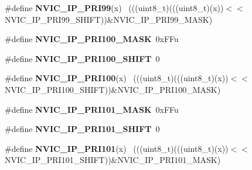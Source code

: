 \begin{DoxyCompactItemize}
\item 
\hypertarget{group___n_v_i_c___register___masks_gad6e4c8571bb74c445e0c6dde178438e6}{}\#define {\bfseries N\+V\+I\+C\+\_\+\+I\+P\+\_\+\+P\+R\+I99}(x)                                              ~(((uint8\+\_\+t)(((uint8\+\_\+t)(x))$<$$<$N\+V\+I\+C\+\_\+\+I\+P\+\_\+\+P\+R\+I99\+\_\+\+S\+H\+I\+F\+T))\&N\+V\+I\+C\+\_\+\+I\+P\+\_\+\+P\+R\+I99\+\_\+\+M\+A\+S\+K)\label{group___n_v_i_c___register___masks_gad6e4c8571bb74c445e0c6dde178438e6}

\item 
\hypertarget{group___n_v_i_c___register___masks_ga1be7b8e0440d5dec0d6f6a9c729865c8}{}\#define {\bfseries N\+V\+I\+C\+\_\+\+I\+P\+\_\+\+P\+R\+I100\+\_\+\+M\+A\+S\+K}~0x\+F\+Fu\label{group___n_v_i_c___register___masks_ga1be7b8e0440d5dec0d6f6a9c729865c8}

\item 
\hypertarget{group___n_v_i_c___register___masks_ga986244ba0782c29fb42e3f813ef25fab}{}\#define {\bfseries N\+V\+I\+C\+\_\+\+I\+P\+\_\+\+P\+R\+I100\+\_\+\+S\+H\+I\+F\+T}~0\label{group___n_v_i_c___register___masks_ga986244ba0782c29fb42e3f813ef25fab}

\item 
\hypertarget{group___n_v_i_c___register___masks_ga7233b1cc0e7696c72eb0ea3a036436be}{}\#define {\bfseries N\+V\+I\+C\+\_\+\+I\+P\+\_\+\+P\+R\+I100}(x)                                            ~(((uint8\+\_\+t)(((uint8\+\_\+t)(x))$<$$<$N\+V\+I\+C\+\_\+\+I\+P\+\_\+\+P\+R\+I100\+\_\+\+S\+H\+I\+F\+T))\&N\+V\+I\+C\+\_\+\+I\+P\+\_\+\+P\+R\+I100\+\_\+\+M\+A\+S\+K)\label{group___n_v_i_c___register___masks_ga7233b1cc0e7696c72eb0ea3a036436be}

\item 
\hypertarget{group___n_v_i_c___register___masks_ga43d4c0600ffbc51f4ef28d3f11dfd663}{}\#define {\bfseries N\+V\+I\+C\+\_\+\+I\+P\+\_\+\+P\+R\+I101\+\_\+\+M\+A\+S\+K}~0x\+F\+Fu\label{group___n_v_i_c___register___masks_ga43d4c0600ffbc51f4ef28d3f11dfd663}

\item 
\hypertarget{group___n_v_i_c___register___masks_gaa8d12d746fdfc06b59d140a69988a749}{}\#define {\bfseries N\+V\+I\+C\+\_\+\+I\+P\+\_\+\+P\+R\+I101\+\_\+\+S\+H\+I\+F\+T}~0\label{group___n_v_i_c___register___masks_gaa8d12d746fdfc06b59d140a69988a749}

\item 
\hypertarget{group___n_v_i_c___register___masks_gaa7949a66310489c1826db329bcd935e6}{}\#define {\bfseries N\+V\+I\+C\+\_\+\+I\+P\+\_\+\+P\+R\+I101}(x)                                            ~(((uint8\+\_\+t)(((uint8\+\_\+t)(x))$<$$<$N\+V\+I\+C\+\_\+\+I\+P\+\_\+\+P\+R\+I101\+\_\+\+S\+H\+I\+F\+T))\&N\+V\+I\+C\+\_\+\+I\+P\+\_\+\+P\+R\+I101\+\_\+\+M\+A\+S\+K)\label{group___n_v_i_c___register___masks_gaa7949a66310489c1826db329bcd935e6}


\end{DoxyCompactItemize}
